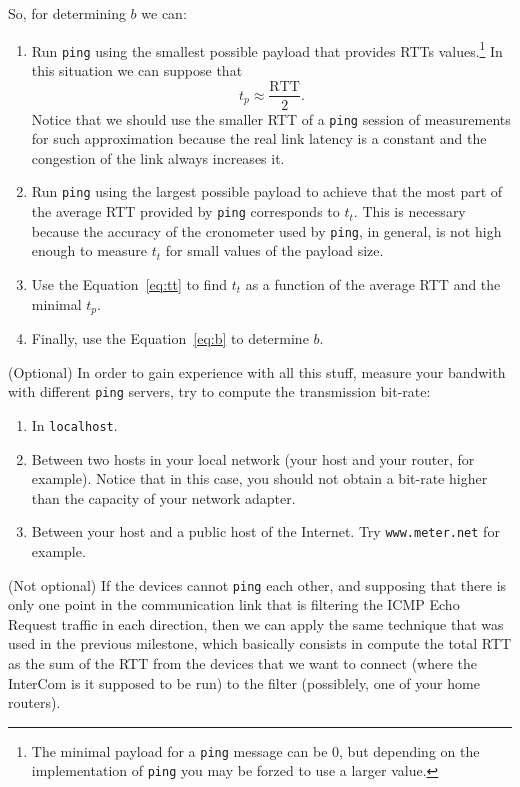 So, for determining $b$ we can:
\begin{enumerate}
\item Run \texttt{ping} using the smallest possible payload that
  provides RTTs values.\footnote{The minimal payload for a
  \texttt{ping} message can be 0, but depending on the implementation
  of \texttt{ping} you may be forzed to use a larger value.} In this
  situation we can suppose that
  \begin{equation}
    t_p \approx \frac{\text{RTT}}{2}.
    \label{eq:tp}
  \end{equation}
  Notice that we should use the smaller RTT of a \texttt{ping} session
  of measurements for such approximation because the real link latency
  is a constant and the congestion of the link always increases
  it.
\item Run \texttt{ping} using the largest possible payload to achieve
  that the most part of the average RTT provided by \texttt{ping}
  corresponds to $t_t$. This is necessary because the accuracy of the
  cronometer used by \texttt{ping}, in general, is not high enough to
  measure $t_t$ for small values of the payload size.
\item Use the Equation~\ref{eq:tt} to find $t_t$ as a function of
  the average RTT and the minimal $t_p$.
\item Finally, use the Equation~\ref{eq:b} to determine $b$.
\end{enumerate}

(Optional) In order to gain experience with all this stuff, measure
your bandwith with different \texttt{ping} servers, try to compute the
transmission bit-rate:
\begin{enumerate}
\item In \texttt{localhost}.
\item Between two hosts in your local network (your host and your
  router, for example). Notice that in this case, you should not
  obtain a bit-rate higher than the capacity of your network adapter.
\item Between your host and a public host of the Internet. Try
  \texttt{www.meter.net} for example.
\end{enumerate}

(Not optional) If the devices cannot \texttt{ping} each other, and
supposing that there is only one point in the communication link that
is filtering the ICMP Echo Request traffic in each direction, then we
can apply the same technique that was used in the previous milestone,
which basically consists in compute the total RTT as the sum of the
RTT from the devices that we want to connect (where the InterCom is it
supposed to be run) to the filter (possiblely, one of your home
routers).

